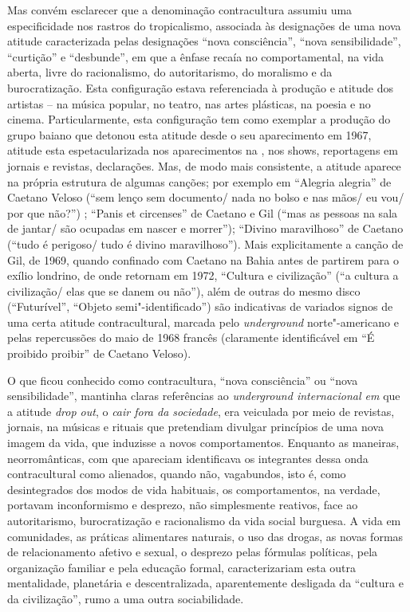 Mas convém esclarecer que a denominação contracultura assumiu uma
especificidade nos rastros do tropicalismo, associada às designações de
uma nova atitude caracterizada pelas designações ``nova consciência'',
``nova sensibilidade'', ``curtição'' e ``desbunde'', em que a ênfase
recaía no comportamental, na vida aberta, livre do racionalismo, do
autoritarismo, do moralismo e da burocratização. Esta configuração
estava referenciada à produção e atitude dos artistas -- na música
popular, no teatro, nas artes plásticas, na poesia e no cinema.
Particularmente, esta configuração tem como exemplar a produção do grupo
baiano que detonou esta atitude desde o seu aparecimento em 1967,
atitude esta espetacularizada nos aparecimentos na , nos shows,
reportagens em jornais e revistas, declarações. Mas, de modo mais
consistente, a atitude aparece na própria estrutura de algumas canções;
por exemplo em ``Alegria alegria'' de Caetano Veloso (``sem lenço sem
documento/ nada no bolso e nas mãos/ eu vou/ por que não?'') ; ``Panis
et circenses'' de Caetano e Gil (``mas as pessoas na sala de jantar/ são
ocupadas em nascer e morrer''); ``Divino maravilhoso'' de Caetano
(``tudo é perigoso/ tudo é divino maravilhoso''). Mais explicitamente a
canção de Gil, de 1969, quando confinado com Caetano na Bahia antes de
partirem para o exílio londrino, de onde retornam em 1972, ``Cultura e
civilização'' (``a cultura a civilização/ elas que se danem ou não''),
além de outras do mesmo disco (``Futurível'', ``Objeto semi"-identificado'') são indicativas de variados signos de uma certa atitude
contracultural, marcada pelo \emph{underground} norte"-americano e
pelas repercussões do maio de 1968 francês (claramente identificável em
``É proibido proibir'' de Caetano Veloso).

O que ficou conhecido como contracultura, ``nova consciência'' ou ``nova
sensibilidade'', mantinha claras referências ao \emph{underground
internacional em} que a atitude \emph{drop out}, o \emph{cair fora da
sociedade}, era veiculada por meio de revistas, jornais, na músicas e
rituais que pretendiam divulgar princípios de uma nova imagem da vida,
que induzisse a novos comportamentos. Enquanto as maneiras,
neorromânticas, com que apareciam identificava os integrantes dessa onda
contracultural como alienados, quando não, vagabundos, isto é, como
desintegrados dos modos de vida habituais, os comportamentos, na
verdade, portavam inconformismo e desprezo, não simplesmente reativos,
face ao autoritarismo, burocratização e racionalismo da vida social
burguesa. A vida em comunidades, as práticas alimentares naturais, o uso
das drogas, as novas formas de relacionamento afetivo e sexual, o
desprezo pelas fórmulas políticas, pela organização familiar e pela
educação formal, caracterizariam esta outra mentalidade, planetária e
descentralizada, aparentemente desligada da ``cultura e da
civilização'', rumo a uma outra sociabilidade.

